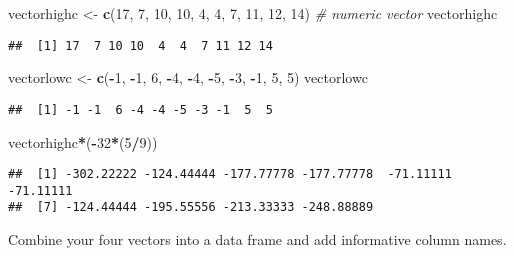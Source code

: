 \documentclass[]{article}
\newenvironment{Shaded}{\begin{snugshade}}{\end{snugshade}}
\newcommand{\KeywordTok}[1]{\textcolor[rgb]{0.13,0.29,0.53}{\textbf{#1}}}
\newcommand{\DecValTok}[1]{\textcolor[rgb]{0.00,0.00,0.81}{#1}}
\newcommand{\StringTok}[1]{\textcolor[rgb]{0.31,0.60,0.02}{#1}}
\newcommand{\CommentTok}[1]{\textcolor[rgb]{0.56,0.35,0.01}{\textit{#1}}}
\newcommand{\OperatorTok}[1]{\textcolor[rgb]{0.81,0.36,0.00}{\textbf{#1}}}
\newcommand{\NormalTok}[1]{#1}
\begin{document}
\begin{Shaded}
\begin{Highlighting}[]
\NormalTok{vectorhighc <-}\StringTok{ }\KeywordTok{c}\NormalTok{(}\DecValTok{17}\NormalTok{, }\DecValTok{7}\NormalTok{, }\DecValTok{10}\NormalTok{, }\DecValTok{10}\NormalTok{, }\DecValTok{4}\NormalTok{, }\DecValTok{4}\NormalTok{, }\DecValTok{7}\NormalTok{, }\DecValTok{11}\NormalTok{, }\DecValTok{12}\NormalTok{, }\DecValTok{14}\NormalTok{) }\CommentTok{# numeric vector}
\NormalTok{vectorhighc}
\end{Highlighting}
\end{Shaded}

\begin{verbatim}
##  [1] 17  7 10 10  4  4  7 11 12 14
\end{verbatim}

\begin{Shaded}
\begin{Highlighting}[]
\NormalTok{vectorlowc <-}\StringTok{ }\KeywordTok{c}\NormalTok{(}\OperatorTok{-}\DecValTok{1}\NormalTok{, }\OperatorTok{-}\DecValTok{1}\NormalTok{, }\DecValTok{6}\NormalTok{, }\OperatorTok{-}\DecValTok{4}\NormalTok{, }\OperatorTok{-}\DecValTok{4}\NormalTok{, }\OperatorTok{-}\DecValTok{5}\NormalTok{, }\OperatorTok{-}\DecValTok{3}\NormalTok{, }\OperatorTok{-}\DecValTok{1}\NormalTok{, }\DecValTok{5}\NormalTok{, }\DecValTok{5}\NormalTok{) }
\NormalTok{vectorlowc}
\end{Highlighting}
\end{Shaded}

\begin{verbatim}
##  [1] -1 -1  6 -4 -4 -5 -3 -1  5  5
\end{verbatim}

\begin{Shaded}
\begin{Highlighting}[]
\NormalTok{vectorhighc}\OperatorTok{*}\NormalTok{(}\OperatorTok{-}\DecValTok{32}\OperatorTok{*}\NormalTok{(}\DecValTok{5}\OperatorTok{/}\DecValTok{9}\NormalTok{))}
\end{Highlighting}
\end{Shaded}

\begin{verbatim}
##  [1] -302.22222 -124.44444 -177.77778 -177.77778  -71.11111  -71.11111
##  [7] -124.44444 -195.55556 -213.33333 -248.88889
\end{verbatim}

Combine your four vectors into a data frame and add informative column
names.
\end{document}
